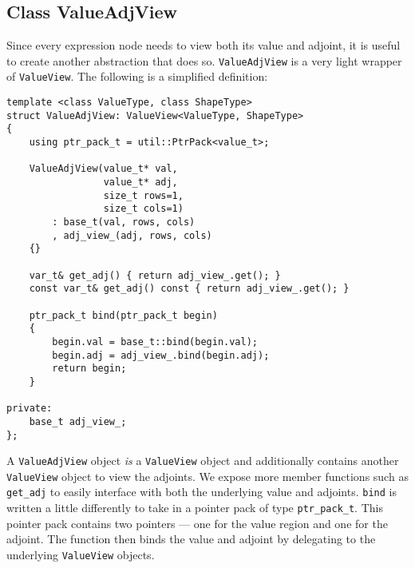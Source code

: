 \subsection{Class ValueAdjView}\label{ssec:value_adj_view}

Since every expression node needs to view both its value and adjoint,
it is useful to create another abstraction that does so.
\verb|ValueAdjView| is a very light wrapper of \verb|ValueView|.
The following is a simplified definition:
\begin{lstlisting}[style=customcpp]
template <class ValueType, class ShapeType>
struct ValueAdjView: ValueView<ValueType, ShapeType>
{
    using ptr_pack_t = util::PtrPack<value_t>;

    ValueAdjView(value_t* val, 
                 value_t* adj,
                 size_t rows=1, 
                 size_t cols=1)
        : base_t(val, rows, cols)
        , adj_view_(adj, rows, cols)
    {}
     
    var_t& get_adj() { return adj_view_.get(); }
    const var_t& get_adj() const { return adj_view_.get(); }

    ptr_pack_t bind(ptr_pack_t begin)
    { 
        begin.val = base_t::bind(begin.val);
        begin.adj = adj_view_.bind(begin.adj);
        return begin;
    }

private:
    base_t adj_view_;
};
\end{lstlisting}
A \verb|ValueAdjView| object \emph{is} a \verb|ValueView| object
and additionally contains another \verb|ValueView| object to view the adjoints.
We expose more member functions such as \verb|get_adj| 
to easily interface with both the underlying value and adjoints.
\verb|bind| is written a little differently to take in a pointer pack of type \verb|ptr_pack_t|.
This pointer pack contains two pointers --- one for the value region and one for the adjoint.
The function then binds the value and adjoint by delegating to the underlying \verb|ValueView| objects.
